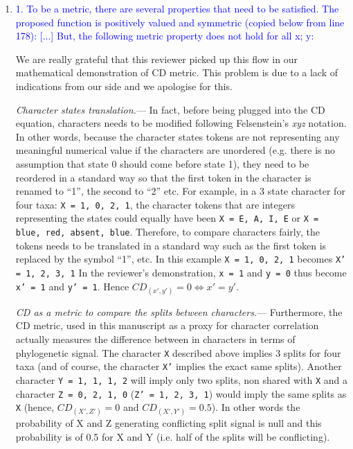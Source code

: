 \documentclass[12pt,letterpaper]{article}
\renewcommand{\subsubsection}[1]{%
\vspace{2ex}
\noindent
\textit{#1.}---}
\begin{document}
\begin{enumerate}

\item{\textcolor{blue}{1. To be a metric, there are several properties that need to be satisfied. The proposed function
is positively valued and symmetric (copied below from line 178): [...] But, the following metric property does not hold for all x; y:}}
\label{proof}

We are really grateful that this reviewer picked up this flow in our mathematical demonstration of CD metric.
This problem is due to a lack of indications from our side and we apologise for this.

\subsubsection{Character states translation}
In fact, before being plugged into the CD equation, characters needs to be modified following Felsenstein's \textit{xyz} notation.
In other words, because the character states tokens are not representing any meaningful numerical value if the characters are unordered (e.g. there is no assumption that state 0 should come before state 1), they need to be reordered in a standard way so that the first token in the character is renamed to ``1'', the second to ``2'' etc.
For example, in a 3 state character for four taxa: \texttt{X = {1, 0, 2, 1}}, the character tokens that are integers representing the states could equally have been \texttt{X = {E, A, I, E}} or \texttt{X = {blue, red, absent, blue}}.
Therefore, to compare characters fairly, the tokens needs to be translated in a standard way such as the first token is replaced by the symbol ``1'', etc.
In this example \texttt{X = {1, 0, 2, 1}} becomes \texttt{X' = {1, 2, 3, 1}}
In the reviewer's demonstration, \texttt{x  = {1}} and \texttt{y  = {0}} thus become \texttt{x' = {1}} and \texttt{y' = {1}}.
Hence $CD_{(x',y')} = 0 \Leftrightarrow x' = y'$.

\subsubsection{CD as a metric to compare the splits between characters}
Furthermore, the CD metric, used in this manuscript as a proxy for character correlation actually measures the difference between in characters in terms of phylogenetic signal.
The character \texttt{X} described above implies 3 splits for four taxa (and of course, the character \texttt{X'} implies the exact same splits).
Another character \texttt{Y = {1, 1, 1, 2}} will imply only two splits, non shared with \texttt{X} and a character \texttt{Z = {0, 2, 1, 0}} (\texttt{Z' = {1, 2, 3, 1}}) would imply the same splits as \texttt{X} (hence, $CD_{(X',Z')} = 0$ and $CD_{(X',Y')} = 0.5$).
In other words the probability of X and Z generating conflicting split signal is null and this probability is of 0.5 for X and Y (i.e. half of the splits will be conflicting).


\end{enumerate}
\end{document}
